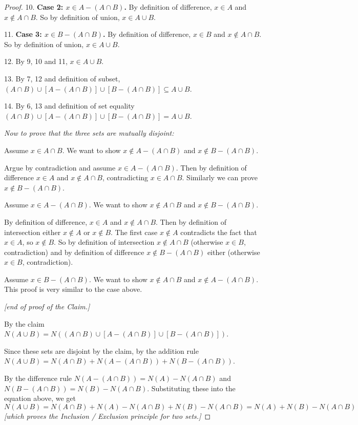 \documentclass[14pt]{extarticle}
\begin{document}
\begin{proof}
     10. {\bf Case 2: \(x \in A - (A \cap B)\).} By definition of difference, \(x \in A\) and \(x \notin A \cap B\). So by
     definition of union, \(x \in A \cup B\).

     11. {\bf Case 3: \(x \in B - (A \cap B)\).} By definition of difference, \(x \in B\) and \(x \notin A \cap B\). So by
     definition of union, \(x \in A \cup B\).

     12. By 9, 10 and 11, \(x \in A \cup B\).

     13. By 7, 12 and definition of subset, \((A \cap B) \cup [A - (A \cap B)] \cup [B - (A \cap B)] \subseteq A \cup B\).

     14. By 6, 13 and definition of set equality \((A \cap B) \cup [A - (A \cap B)] \cup [B - (A \cap B)] = A \cup B\).

          {\it Now to prove that the three sets are mutually disjoint:}

     Assume \(x \in A \cap B\). We want to show \(x \notin A - (A \cap B)\) and \(x \notin B - (A \cap B)\).

     Argue by contradiction and assume \(x \in A - (A \cap B)\). Then by definition of difference \(x \in A\) and \(x \notin
     A \cap B\), contradicting \(x \in A\cap B\). Similarly we can prove \(x \notin B - (A \cap B)\).

     Assume \(x \in A - (A \cap B)\). We want to show \(x \notin A \cap B\) and \(x \notin B - (A \cap B)\).

     By definition of difference, \(x \in A\) and \(x \notin A \cap B\). Then by definition of intersection either
     \(x \notin A\) or \(x \notin B\). The first case \(x \notin A\) contradicts the fact that \(x\in A\), so \(x\notin B\).
     So by definition of intersection \(x \notin A \cap B\) (otherwise \(x \in B\), contradiction) and by definition of
     difference \(x \notin B - (A \cap B)\) either (otherwise \(x \in B\), contradiction).

     Assume \(x \in B - (A \cap B)\). We want to show \(x \notin A \cap B\) and \(x \notin A - (A \cap B)\). This proof is
     very similar to the case above.

          {\it [end of proof of the Claim.]}

     By the claim \(N(A \cup B) = N((A \cap B) \cup [A - (A \cap B)] \cup [B - (A \cap B)])\).

     Since these sets are disjoint by the claim, by the addition rule \(N(A \cup B) = N(A \cap B) + N(A - (A \cap B)) + N(B
     - (A \cap B)).\)

     By the difference rule \(N(A - (A \cap B)) = N(A) - N(A \cap B)\) and \(N(B - (A \cap B)) = N(B) - N(A \cap B)\).
     Substituting these into the equation above, we get
     \[
          N(A \cup B) = N(A \cap B) + N(A) - N(A \cap B) + N(B) - N(A \cap B) = N(A) + N(B) - N(A \cap B)
     \]
     {\it [which proves the Inclusion / Exclusion principle for two sets.]}
\end{proof}
\end{document}
